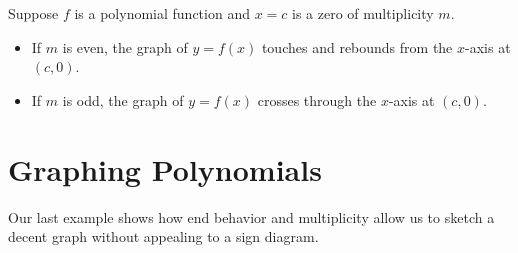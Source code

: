 \documentclass{ximera}
\begin{document}
\begin{theorem}
 Suppose $f$ is a polynomial function  and $x=c$ is a zero of multiplicity $m$.  

\begin{itemize}

\item  If $m$ is even, the graph of $y=f(x)$ touches and rebounds from the $x$-axis at $(c,0)$.

\item  If $m$ is odd, the graph of $y=f(x)$ crosses through the $x$-axis at $(c,0)$.

\end{itemize}
\end{theorem}

\section{Graphing Polynomials}

Our last example shows how end behavior and multiplicity allow us to sketch a decent graph without appealing to a sign diagram.
\end{document}
